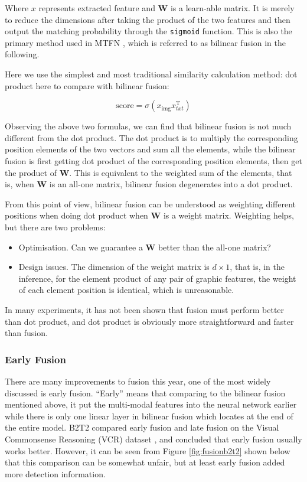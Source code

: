 Where $x$ represents extracted feature and $\mathbf{W}$ is a learn-able matrix. It is merely to reduce the dimensions after taking the product of the two features and then output the matching probability through the \verb|sigmoid| function. This is also the primary method used in MTFN \cite{MTFN}, which is referred to as bilinear fusion in the following.

Here we use the simplest and most traditional similarity calculation method: dot product here to compare with bilinear fusion:

$$
\text {score}=\sigma\left(x_{\text {img}} x_{t x t}^{\mathrm{T}}\right)
$$

Observing the above two formulas, we can find that bilinear fusion is not much different from the dot product. The dot product is to multiply the corresponding position elements of the two vectors and sum all the elements, while the bilinear fusion is first getting dot product of the corresponding position elements, then get the product of $\mathbf{W}$. This is equivalent to the weighted sum of the elements, that is, when $\mathbf{W}$ is an all-one matrix, bilinear fusion degenerates into a dot product.

From this point of view, bilinear fusion can be understood as weighting different positions when doing dot product when $\mathbf{W}$ is a weight matrix. Weighting helps, but there are two problems:

\begin{itemize}
    \item Optimisation. Can we guarantee a $\mathbf{W}$ better than the all-one matrix?
    \item Design issues. The dimension of the weight matrix is $d\times1$, that is, in the inference, for the element product of any pair of graphic features, the weight of each element position is identical, which is unreasonable.
\end{itemize}

In many experiments, it has not been shown that fusion must perform better than dot product, and dot product is obviously more straightforward and faster than fusion.

\subsubsection{Early Fusion}
There are many improvements to fusion this year, one of the most widely discussed is early fusion. ``Early'' means that comparing to the bilinear fusion mentioned above, it put the multi-modal features into the neural network earlier while there is only one linear layer in bilinear fusion which locates at the end of the entire model. B2T2 \cite{B2T2} compared early fusion and late fusion on the Visual Commonsense Reasoning (VCR) dataset \cite{zellers2019vcr}, and concluded that early fusion usually works better. However, it can be seen from Figure \ref{fig:fusionb2t2} shown below that this comparison can be somewhat unfair, but at least early fusion added more detection information.

